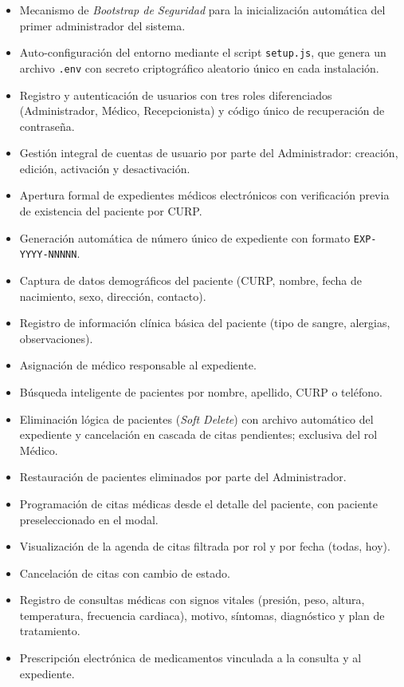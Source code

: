 \documentclass[11pt,a4paper]{article}
\begin{document}
\begin{itemize}
    \item Mecanismo de \textit{Bootstrap de Seguridad} para la inicialización automática del primer administrador del sistema.
    \item Auto-configuración del entorno mediante el script \texttt{setup.js}, que genera un archivo \texttt{.env} con secreto criptográfico aleatorio único en cada instalación.
    \item Registro y autenticación de usuarios con tres roles diferenciados (Administrador, Médico, Recepcionista) y código único de recuperación de contraseña.
    \item Gestión integral de cuentas de usuario por parte del Administrador: creación, edición, activación y desactivación.
    \item Apertura formal de expedientes médicos electrónicos con verificación previa de existencia del paciente por CURP.
    \item Generación automática de número único de expediente con formato \texttt{EXP-YYYY-NNNNN}.
    \item Captura de datos demográficos del paciente (CURP, nombre, fecha de nacimiento, sexo, dirección, contacto).
    \item Registro de información clínica básica del paciente (tipo de sangre, alergias, observaciones).
    \item Asignación de médico responsable al expediente.
    \item Búsqueda inteligente de pacientes por nombre, apellido, CURP o teléfono.
    \item Eliminación lógica de pacientes (\textit{Soft Delete}) con archivo automático del expediente y cancelación en cascada de citas pendientes; exclusiva del rol Médico.
    \item Restauración de pacientes eliminados por parte del Administrador.
    \item Programación de citas médicas desde el detalle del paciente, con paciente preseleccionado en el modal.
    \item Visualización de la agenda de citas filtrada por rol y por fecha (todas, hoy).
    \item Cancelación de citas con cambio de estado.
    \item Registro de consultas médicas con signos vitales (presión, peso, altura, temperatura, frecuencia cardiaca), motivo, síntomas, diagnóstico y plan de tratamiento.
    \item Prescripción electrónica de medicamentos vinculada a la consulta y al expediente.

\end{itemize}
\end{document}
